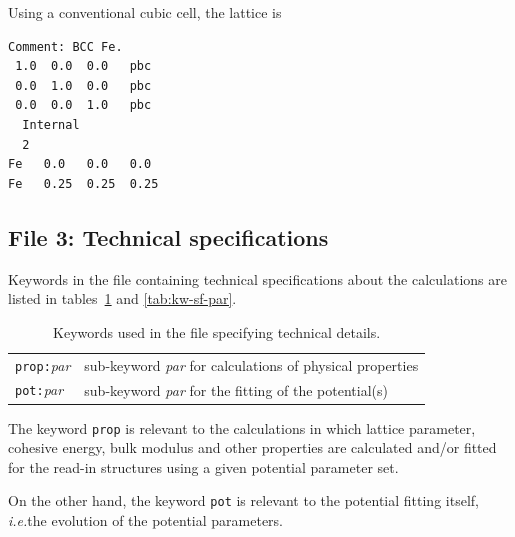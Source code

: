 \documentclass[a4paper,12pt,onecolumn]{article}
\makeatletter
\newcommand{\ie}{\emph{i.e.\@\xspace}}
\makeatother
\begin{document}
Using a conventional cubic cell, the lattice is

\begin{verbatim}
Comment: BCC Fe.
 1.0  0.0  0.0   pbc
 0.0  1.0  0.0   pbc
 0.0  0.0  1.0   pbc
  Internal
  2
Fe   0.0   0.0   0.0
Fe   0.25  0.25  0.25
\end{verbatim}








\subsection{File 3: Technical specifications}


Keywords in the file containing technical specifications about the
calculations are listed in tables~\ref{tab:kw-sf} and
\ref{tab:kw-sf-par}.


\begin{table}[!h]
\caption{
Keywords used in the file specifying technical details.
\label{tab:kw-sf}
}
\begin{center}
\begin{tabular}{|l|l|}
\hline
\hline
\verb+prop:+\textit{par}  & sub-keyword \textit{par} for calculations of physical properties \\
\verb+pot:+\textit{par}   & sub-keyword \textit{par} for the fitting of the potential(s) \\
\hline
\hline
\end{tabular}
\end{center}
\end{table}


The keyword \verb+prop+ is relevant to the calculations in which
lattice parameter, cohesive energy, bulk modulus and other
properties are calculated and/or fitted for the read-in structures
using a given potential parameter set.

On the other hand, the keyword \verb+pot+ is relevant to the
potential fitting itself, \ie the evolution of the potential
parameters.
\end{document}
